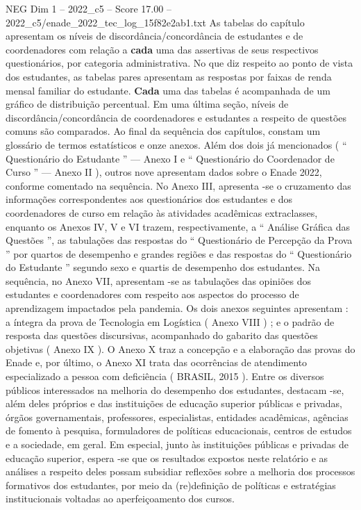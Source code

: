 \begin{textsample}{NEG Dim 1 – 2022\_c5 – Score 17.00 – 2022\_c5/enade\_2022\_tec\_log\_15f82e2ab1.txt}
As tabelas do capítulo apresentam os níveis de discordância/concordância de estudantes e de coordenadores com relação a \textbf{cada} uma das assertivas de seus respectivos questionários, por categoria administrativa.
No que diz respeito ao ponto de vista dos estudantes, as tabelas pares apresentam as respostas por faixas de renda mensal familiar do estudante. \textbf{Cada} uma das tabelas é acompanhada de um gráfico de distribuição percentual.
Em uma última seção, níveis de discordância/concordância de coordenadores e estudantes a respeito de questões comuns são comparados.
Ao final da sequência dos capítulos, constam um glossário de termos estatísticos e onze anexos.
Além dos dois já mencionados ( “ Questionário do Estudante ” — Anexo I e “ Questionário do Coordenador de Curso ” — Anexo II ), outros nove apresentam dados sobre o Enade 2022, conforme comentado na sequência.
No Anexo III, apresenta -se o cruzamento das informações correspondentes aos questionários dos estudantes e dos coordenadores de curso em relação às atividades acadêmicas extraclasses, enquanto os Anexos IV, V e VI trazem, respectivamente, a “ Análise Gráfica das Questões ”, as tabulações das respostas do “ Questionário de Percepção da Prova ” por quartos de desempenho e grandes regiões e das respostas do “ Questionário do Estudante ” segundo sexo e quartis de desempenho dos estudantes.
Na sequência, no Anexo VII, apresentam -se as tabulações das opiniões dos estudantes e coordenadores com respeito aos aspectos do processo de aprendizagem impactados pela pandemia.
Os dois anexos seguintes apresentam : a íntegra da prova de Tecnologia em Logística ( Anexo VIII ) ; e o padrão de resposta das questões discursivas, acompanhado do gabarito das questões objetivas ( Anexo IX ).
O Anexo X traz a concepção e a elaboração das provas do Enade e, por último, o Anexo XI trata das ocorrências de atendimento especializado a pessoa com deficiência ( BRASIL, 2015 ).
Entre os diversos públicos interessados na melhoria do desempenho dos estudantes, destacam -se, além deles próprios e das instituições de educação superior públicas e privadas, órgãos governamentais, professores, especialistas, entidades acadêmicas, agências de fomento à pesquisa, formuladores de políticas educacionais, centros de estudos e a sociedade, em geral.
Em especial, junto às instituições públicas e privadas de educação superior, espera -se que os resultados expostos neste relatório e as análises a respeito deles possam subsidiar reflexões sobre a melhoria dos processos formativos dos estudantes, por meio da (re)definição de políticas e estratégias institucionais voltadas ao aperfeiçoamento dos cursos.

\end{textsample}
